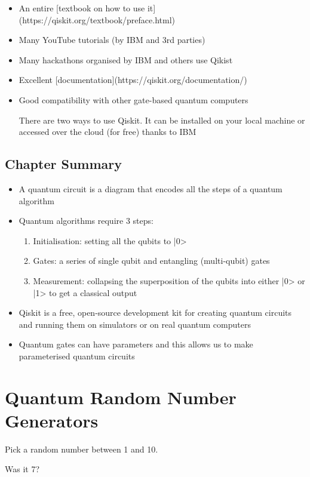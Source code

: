 \documentclass{book}
\begin{document}
\begin{itemize}

    \item An entire [textbook on how to use it](https://qiskit.org/textbook/preface.html) 
    \item Many YouTube tutorials (by IBM and 3rd parties)
    \item Many hackathons organised by IBM and others use Qikist
    \item Excellent [documentation](https://qiskit.org/documentation/) 
    \item Good compatibility with other gate-based quantum computers

There are two ways to use Qiskit. It can be installed on your local machine or accessed over the cloud (for free) thanks to IBM
\end{itemize}
\section{Chapter Summary}

\begin{itemize}
\item A quantum circuit is a diagram that encodes all the steps of a quantum algorithm
\item Quantum algorithms require 3 steps:
\begin{enumerate}
    \item Initialisation: setting all the qubits to |0>
    \item Gates: a series of single qubit and entangling (multi-qubit) gates
    \item Measurement: collapsing the superposition of the qubits into either |0> or |1> to get a classical output 
\end{enumerate}
\item Qiskit is a free, open-source development kit for creating quantum circuits and running them on simulators or on real quantum computers
\item Quantum gates can have parameters and this allows us to make parameterised quantum circuits 

\end{itemize}
\chapter{Quantum Random Number Generators}

Pick a random number between 1 and 10. 

Was it 7?    
\end{document}
